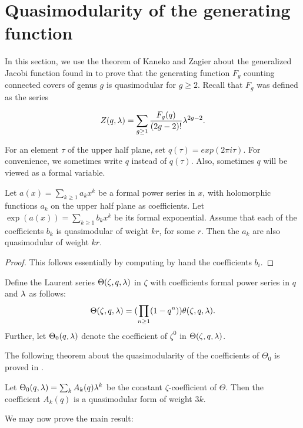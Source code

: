 \section{Quasimodularity of the generating function}

In this section, we use the theorem of Kaneko and Zagier about the generalized Jacobi function found in \cite{Kaneko-Zagier1995} to prove that the generating function $F_g$ counting connected covers of genus $g$ is quasimodular for $g\geq 2$. Recall that $F_g$ was defined as the series

 \[Z(q,\lambda) = \sum_{g\geq 1}\frac{F_g(q)}{(2g-2)!}\lambda^{2g-2}.\]
 
For an element $\tau$ of the upper half plane, set $q(\tau)=exp(2\pi i \tau)$. For convenience, we sometimes write $q$ instead of $q(\tau)$. Also, sometimes $q$ will be viewed as a formal variable.

\begin{prop} \label{prop:exp-quasimodular}
 Let $a(x)=\sum_{k\geq 1} a_k x^k$ be a formal power series in $x$, with holomorphic functions $a_k$ on the upper half plane as coefficients. Let $\exp(a(x))=\sum_{k\geq 1} b_k x^k$ be its formal exponential. Assume that each of the coefficients $b_k$ is quasimodular of weight $kr$, for some $r$. Then the $a_k$ are also quasimodular of weight $kr$.
\end{prop}
\begin{proof}
 This follows essentially by computing by hand the coefficients $b_i$.
\end{proof}

\begin{defi}
 Define the Laurent series $\Theta(\zeta,q,\lambda)$ in $\zeta$ with coefficients formal power series in $q$ and $\lambda$ as follows:
 \[
  \Theta(\zeta,q,\lambda)=(\prod_{n\geq 1}(1-q^n))\theta(\zeta,q,\lambda).
 \]
 Further, let $\Theta_0(q,\lambda)$ denote the coefficient of $\zeta^0$ in $\Theta(\zeta,q,\lambda)$.
\end{defi}

The following theorem about the quasimodularity of the coefficients of $\Theta_0$ is proved in \cite{Kaneko-Zagier1995}.

\begin{thm}
 Let $\Theta_0(q,\lambda)=\sum_{k}A_k(q)\lambda^k$ be the constant $\zeta$-coefficient of $\Theta$. Then the coefficient $A_k(q)$ is a quasimodular form of weight $3k$.
\end{thm}

We may now prove the main result:

